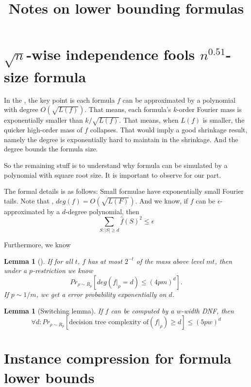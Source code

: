 \documentclass[12pt]{article}
\title{Notes on lower bounding formulas}
\newtheorem{lemma}[theorem]{Lemma}
\renewcommand{\.}{,\ldots,}
\begin{document}
		\maketitle 

\newcommand{\F}{\mathcal{F}}		
\newcommand{\E}{\mathbb{E}}		
\renewcommand{\a}{\alpha}		


\section{$\sqrt{n}$-wise independence fools $n^{0.51}$-size formula}


In the \cite{tal2014shrinkage}, the key point is each formula $f$ can be approximated by a polynomial with degree $O(\sqrt{L(f)})$. That means, each formula's $k$-order  Fourier mass is exponentially smaller than $k/\sqrt{L(f)}$. That means, when $L(f)$ is smaller, the quicker high-order mass of $f$ collapses.  That would imply a good shrinkage result, namely the degree is exponentially hard to maintain in the shrinkage. And the degree bounds the formula size. 

So the remaining stuff is to understand why formula can be simulated by a polynomial with square root size. It is important to observe for our part. 

The formal details is as follows: 
Small formulae have exponentially small Fourier tails. Note that , $deg(f)=O(\sqrt{L(F)})$. And we know, if $f$ can be $\epsilon$-approximated by a $d$-degree polynomial, then 
$$\sum_{S:|S|\geq d}\hat f(S)^2\leq \epsilon$$


Furthermore, we know 
\begin{lemma}[\cite{tal2014shrinkage}]
	If for all $t$, $f$ has at most $2^{-t}$ of the mass above level $mt$, then under a $p$-restriction we know 
	$$Pr_{\rho\sim R_p}[deg(f|_{\rho}= d)\leq (4pm)^d].$$
	If $p\sim 1/m$, we get a error probability exponentially on $d$.
\end{lemma}

\begin{lemma}[Switching lemma]
If $f$ can be computed by a $w$-width DNF, then
$$\forall d: Pr_{\rho\sim R_p}[\text{decision tree complexity of}(f|_\rho)\geq d]\leq (5pw)^d $$
\end{lemma}
\section{Instance compression for formula lower bounds}
\end{document}
